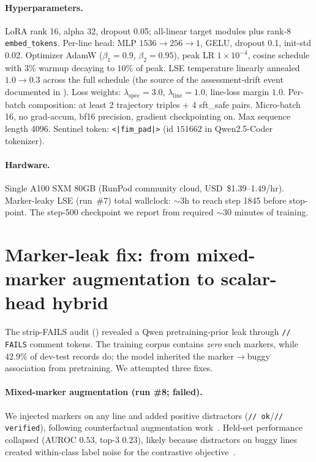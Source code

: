 \documentclass[10pt]{article}
\begin{document}
\paragraph{Hyperparameters.}
LoRA rank 16, alpha 32, dropout 0.05; all-linear target modules
plus rank-8 \texttt{embed\_tokens}. Per-line head: MLP $1536 \to 256 \to 1$,
GELU, dropout 0.1, init-std 0.02. Optimizer AdamW ($\beta_1 {=}0.9$,
$\beta_2 {=} 0.95$), peak LR $1{\times}10^{-4}$, cosine schedule with
$3\%$ warmup decaying to $10\%$ of peak. LSE temperature linearly
annealed $1.0 \to 0.3$ across the full schedule (the source of the
assessment-drift event documented in ). Loss weights:
$\lambda_{\text{spec}} = 3.0$, $\lambda_{\text{line}} = 1.0$, line-loss
margin $1.0$. Per-batch composition: at least 2 trajectory triples + 4
sft\_safe pairs. Micro-batch 16, no grad-accum, bf16 precision,
gradient checkpointing on. Max sequence length 4096. Sentinel token:
\verb+<|fim_pad|>+ (id $151662$ in Qwen2.5-Coder tokenizer).

\paragraph{Hardware.}
Single A100 SXM 80GB (RunPod community cloud, USD~\$1.39--1.49/hr).
Marker-leaky LSE (run~\#7) total wallclock: $\sim$3h to reach step 1845 before
stop-point. The step-500 checkpoint we report from required
$\sim$30 minutes of training.

\section{Marker-leak fix: from mixed-marker augmentation to scalar-head hybrid}
\label{app:marker-aug}

The strip-FAILS audit ()
revealed a Qwen pretraining-prior leak through \texttt{// FAILS}
comment tokens. The training corpus contains \emph{zero} such
markers, while $42.9\%$ of dev-test records do; the model inherited
the marker$\to$buggy association from pretraining. We attempted three
fixes.

\paragraph{Mixed-marker augmentation (run \#8; failed).} We injected
markers on any line and added positive distractors
(\texttt{// ok}/\texttt{// verified}), following counterfactual
augmentation work~\cite{kaushik2020counterfactual,goyal2019counterfactualvqa,veitch2021counterfactual,rabin2021generalizability}.
Held-set performance collapsed (AUROC $0.53$, top-3 $0.23$), likely
because distractors on buggy lines created within-class label noise for
the contrastive objective~\cite{khosla2020supervised,wang2020alignment}.
\end{document}
